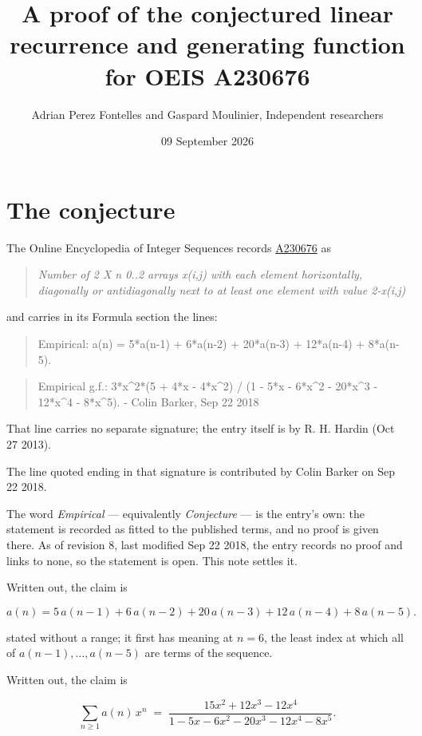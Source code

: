 \documentclass[11pt]{article}
\title{A proof of the conjectured linear recurrence and generating function for OEIS A230676}
\author{Adrian Perez Fontelles and Gaspard Moulinier, Independent researchers}
\date{09 September 2026}
\theoremstyle{definition}
\begin{document}
\maketitle
\section{The conjecture}

The Online Encyclopedia of Integer Sequences records \href{https://oeis.org/A230676}{A230676} as

\begin{quote}\itshape Number of 2 X n 0..2 arrays x(i,j) with each element horizontally, diagonally or antidiagonally next to at least one element with value 2-x(i,j)\end{quote}

and carries in its Formula section the lines:

\begin{quote}\ttfamily Empirical: a(n) = 5*a(n-1) + 6*a(n-2) + 20*a(n-3) + 12*a(n-4) + 8*a(n-5).\end{quote}

\begin{quote}\ttfamily Empirical g.f.: 3*x\textasciicircum{}2*(5 + 4*x - 4*x\textasciicircum{}2) / (1 - 5*x - 6*x\textasciicircum{}2 - 20*x\textasciicircum{}3 - 12*x\textasciicircum{}4 - 8*x\textasciicircum{}5). - Colin Barker, Sep 22 2018\end{quote}

That line carries no separate signature; the entry itself is by R. H. Hardin (Oct 27 2013).

The line quoted ending in that signature is contributed by Colin Barker on Sep 22 2018.

The word {\itshape Empirical} --- equivalently {\itshape Conjecture} --- is the entry's own: the statement is recorded as fitted to the published terms, and no proof is given there. As of revision 8, last modified Sep 22 2018, the entry records no proof and links to none, so the statement is open. This note settles it.

Written out, the claim is

\[a(n) = 5\,a(n-1) + 6\,a(n-2) + 20\,a(n-3) + 12\,a(n-4) + 8\,a(n-5).\]

stated without a range; it first has meaning at $n = 6$, the least index at which all of $a(n-1),\dots,a(n-5)$ are terms of the sequence.

Written out, the claim is

\[\sum_{n \ge 1} a(n)\,x^n \;=\; \frac{15x^{2} + 12x^{3} - 12x^{4}}{1 - 5x - 6x^{2} - 20x^{3} - 12x^{4} - 8x^{5}}.\]
\end{document}
